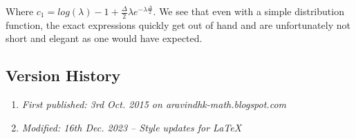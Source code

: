 Where $c_1 = log(\lambda) - 1 + \frac{\Delta}{2}\lambda e^{-\lambda\frac{\Delta}{2}}$. We see that even with a simple distribution function, the exact expressions quickly get out of hand and are unfortunately not short and elegant as one would have expected.

\subsection{Version History}
\begin{enumerate}
	\item \emph{First published: 3rd Oct. 2015 on aravindhk-math.blogspot.com}
	\item \emph{Modified: 16th Dec. 2023 -- Style updates for \LaTeX}
\end{enumerate}
